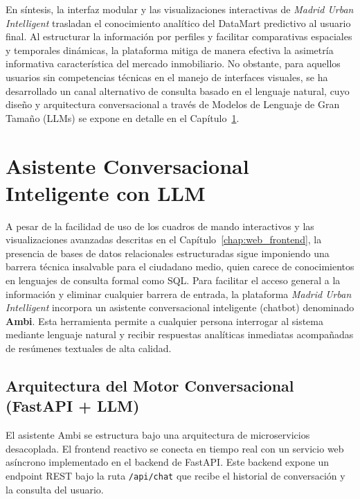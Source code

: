 \documentclass[a4paper,11pt,openany]{book}
\begin{document}
En síntesis, la interfaz modular y las visualizaciones interactivas de \textit{Madrid Urban Intelligent} trasladan el conocimiento analítico del DataMart predictivo al usuario final. Al estructurar la información por perfiles y facilitar comparativas espaciales y temporales dinámicas, la plataforma mitiga de manera efectiva la asimetría informativa característica del mercado inmobiliario. No obstante, para aquellos usuarios sin competencias técnicas en el manejo de interfaces visuales, se ha desarrollado un canal alternativo de consulta basado en el lenguaje natural, cuyo diseño y arquitectura conversacional a través de Modelos de Lenguaje de Gran Tamaño (LLMs) se expone en detalle en el Capítulo~\ref{chap:conversational_bot}.


\chapter{Asistente Conversacional Inteligente con LLM}
\label{chap:conversational_bot}
A pesar de la facilidad de uso de los cuadros de mando interactivos y las visualizaciones avanzadas descritas en el Capítulo~\ref{chap:web_frontend}, la presencia de bases de datos relacionales estructuradas sigue imponiendo una barrera técnica insalvable para el ciudadano medio, quien carece de conocimientos en lenguajes de consulta formal como SQL. Para facilitar el acceso general a la información y eliminar cualquier barrera de entrada, la plataforma \textit{Madrid Urban Intelligent} incorpora un asistente conversacional inteligente (chatbot) denominado \textbf{Ambi}. Esta herramienta permite a cualquier persona interrogar al sistema mediante lenguaje natural y recibir respuestas analíticas inmediatas acompañadas de resúmenes textuales de alta calidad.

\section{Arquitectura del Motor Conversacional (FastAPI + LLM)}
El asistente Ambi se estructura bajo una arquitectura de microservicios desacoplada. El frontend reactivo se conecta en tiempo real con un servicio web asíncrono implementado en el backend de FastAPI. Este backend expone un endpoint REST bajo la ruta \texttt{/api/chat} que recibe el historial de conversación y la consulta del usuario.
\end{document}
